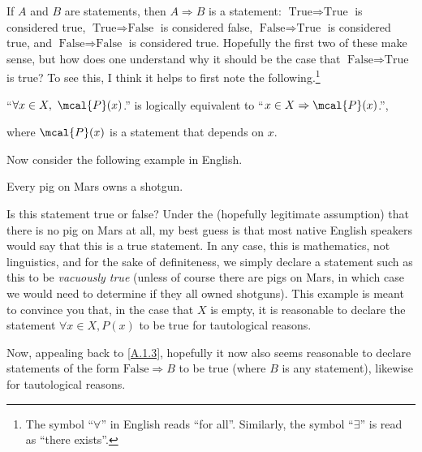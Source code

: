 If $A$ and $B$ are statements, then $A\Rightarrow B$ is a statement:  $\text{True}\Rightarrow \text{True}$ is considered true, $\text{True}\Rightarrow \text{False}$ is considered false, $\text{False}\Rightarrow \text{True}$ is considered true, and $\text{False}\Rightarrow \text{False}$ is considered true.  Hopefully the first two of these make sense, but how does one understand why it should be the case that $\text{False}\Rightarrow \text{True}$ is true?  To see this, I think it helps to first note the following.\footnote{The symbol ``$\forall$\index[notation]{$\forall$}'' in English reads ``for all''.  Similarly, the symbol ``$\exists$\index[notation]{$\exists$}'' is read as ``there exists''.}
\begin{textequation}[A.1.3]
``$\forall x\in X,\ \mcal{P}(x)$.'' is logically equivalent to ``$x\in X\Rightarrow \mcal{P}(x)$.'',
\end{textequation}
where $\mcal{P}(x)$ is a statement that depends on $x$.

Now consider the following example in English.
\begin{textequation}
Every pig on Mars owns a shotgun.
\end{textequation}
Is this statement true or false?  Under the (hopefully legitimate assumption) that there is no pig on Mars at all, my best guess is that most native English speakers would say that this is a true statement.  In any case, this is mathematics, not linguistics, and for the sake of definiteness, we simply declare a statement such as this to be \emph{vacuously true} (unless of course there are pigs on Mars, in which case we would need to determine if they all owned shotguns).  This example is meant to convince you that, in the case that $X$ is empty, it is reasonable to declare the statement $\forall x\in X,P(x)$ to be true for tautological reasons.

Now, appealing back to \eqref{A.1.3}, hopefully it now also seems reasonable to declare statements of the form $\text{False}\Rightarrow B$ to be true (where $B$ is any statement), likewise for tautological reasons.

